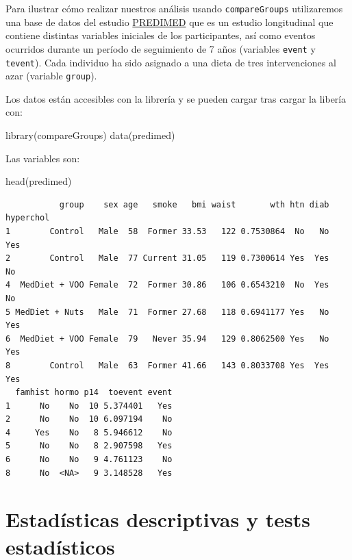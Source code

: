 \documentclass[
]{book}
\newenvironment{Shaded}{\begin{snugshade}}{\end{snugshade}}
\newcommand{\FunctionTok}[1]{\textcolor[rgb]{0.00,0.00,0.00}{#1}}
\newcommand{\NormalTok}[1]{#1}
\begin{document}
Para ilustrar cómo realizar nuestros análisis usando \texttt{compareGroups} utilizaremos una base de datos del estudio \href{http://www.cat.isciii.es/ISCIII/es/contenidos/fd-el-instituto/fd-comunicacion/fd-noticias/PREDIMED-2013.pdf}{PREDIMED} que es un estudio longitudinal que contiene distintas variables iniciales de los participantes, así como eventos ocurridos durante un período de seguimiento de 7 años (variables \texttt{event} y \texttt{tevent}). Cada individuo ha sido asignado a una dieta de tres intervenciones al azar (variable \texttt{group}).

Los datos están accesibles con la librería y se pueden cargar tras cargar la libería con:

\begin{Shaded}
\begin{Highlighting}[]
\FunctionTok{library}\NormalTok{(compareGroups)}
\FunctionTok{data}\NormalTok{(predimed)}
\end{Highlighting}
\end{Shaded}

Las variables son:

\begin{Shaded}
\begin{Highlighting}[]
\FunctionTok{head}\NormalTok{(predimed)}
\end{Highlighting}
\end{Shaded}

\begin{verbatim}
           group    sex age   smoke   bmi waist       wth htn diab hyperchol
1        Control   Male  58  Former 33.53   122 0.7530864  No   No       Yes
2        Control   Male  77 Current 31.05   119 0.7300614 Yes  Yes        No
4  MedDiet + VOO Female  72  Former 30.86   106 0.6543210  No  Yes        No
5 MedDiet + Nuts   Male  71  Former 27.68   118 0.6941177 Yes   No       Yes
6  MedDiet + VOO Female  79   Never 35.94   129 0.8062500 Yes   No       Yes
8        Control   Male  63  Former 41.66   143 0.8033708 Yes  Yes       Yes
  famhist hormo p14  toevent event
1      No    No  10 5.374401   Yes
2      No    No  10 6.097194    No
4     Yes    No   8 5.946612    No
5      No    No   8 2.907598   Yes
6      No    No   9 4.761123    No
8      No  <NA>   9 3.148528   Yes
\end{verbatim}

\hypertarget{estaduxedsticas-descriptivas-y-tests-estaduxedsticos}{%
\section{Estadísticas descriptivas y tests estadísticos}\label{estaduxedsticas-descriptivas-y-tests-estaduxedsticos}}
\end{document}
